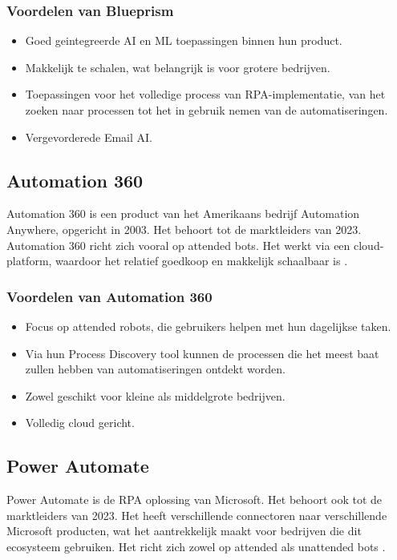 \subsubsection{Voordelen van Blueprism}

\begin{itemize}
    \item Goed geintegreerde AI en ML toepassingen binnen hun product.
    \item Makkelijk te schalen, wat belangrijk is voor grotere bedrijven.
    \item Toepassingen voor het volledige process van RPA-implementatie, van het zoeken naar processen tot het in gebruik nemen van de automatiseringen.
    \item Vergevorderede Email AI.
\end{itemize}

\subsection{Automation 360}

Automation 360 is een product van het Amerikaans bedrijf Automation Anywhere, opgericht in 2003. Het behoort tot de marktleiders van 2023. Automation 360 richt zich vooral op attended bots. Het werkt via een cloud-platform, waardoor het relatief goedkoop en makkelijk schaalbaar is \autocite{GartnerAutomationAnywhere2023}.

\subsubsection{Voordelen van Automation 360}

\begin{itemize}
    \item Focus op attended robots, die gebruikers helpen met hun dagelijkse taken.
    \item Via hun Process Discovery tool kunnen de processen die het meest baat zullen hebben van automatiseringen ontdekt worden.
    \item Zowel geschikt voor kleine als middelgrote bedrijven.
    \item Volledig cloud gericht.
\end{itemize}

\subsection{Power Automate}

Power Automate is de RPA oplossing van Microsoft. Het behoort ook tot de marktleiders van 2023. Het heeft verschillende connectoren naar verschillende Microsoft producten, wat het aantrekkelijk maakt voor bedrijven die dit ecosysteem gebruiken. Het richt zich zowel op attended als unattended bots \autocite{GartnerMicrosoftPA2023}.

